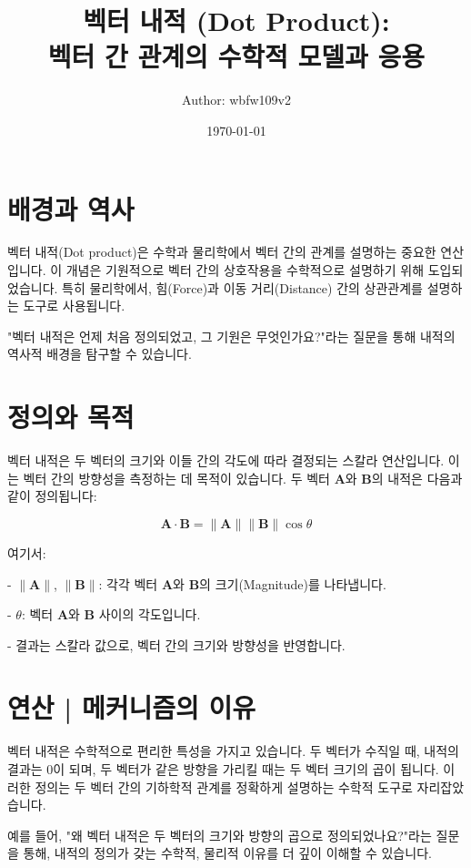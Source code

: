 \documentclass[12pt]{article}
\title{
    벡터 내적 (Dot Product): \\
    벡터 간 관계의 수학적 모델과 응용
}
\author{Author: wbfw109v2}
\date{\today}
\begin{document}
\maketitle
\tableofcontents

\section{배경과 역사}

\noindent 벡터 내적(Dot product)은 수학과 물리학에서 벡터 간의 관계를 설명하는 중요한 연산입니다. 이 개념은 기원적으로 벡터 간의 상호작용을 수학적으로 설명하기 위해 도입되었습니다. 특히 물리학에서, 힘(Force)과 이동 거리(Distance) 간의 상관관계를 설명하는 도구로 사용됩니다.

\noindent "벡터 내적은 언제 처음 정의되었고, 그 기원은 무엇인가요?"라는 질문을 통해 내적의 역사적 배경을 탐구할 수 있습니다.

\section{정의와 목적}

\noindent 벡터 내적은 두 벡터의 크기와 이들 간의 각도에 따라 결정되는 스칼라 연산입니다. 이는 벡터 간의 방향성을 측정하는 데 목적이 있습니다. 두 벡터 \( \mathbf{A} \)와 \( \mathbf{B} \)의 내적은 다음과 같이 정의됩니다:

\[
  \mathbf{A} \cdot \mathbf{B} = \| \mathbf{A} \| \| \mathbf{B} \| \cos{\theta}
\]

\noindent 여기서:

- \( \| \mathbf{A} \| \), \( \| \mathbf{B} \| \): 각각 벡터 \( \mathbf{A} \)와 \( \mathbf{B} \)의 크기(Magnitude)를 나타냅니다.

- \( \theta \): 벡터 \( \mathbf{A} \)와 \( \mathbf{B} \) 사이의 각도입니다.

- 결과는 스칼라 값으로, 벡터 간의 크기와 방향성을 반영합니다.

\section{연산 | 메커니즘의 이유}

\noindent 벡터 내적은 수학적으로 편리한 특성을 가지고 있습니다. 두 벡터가 수직일 때, 내적의 결과는 0이 되며, 두 벡터가 같은 방향을 가리킬 때는 두 벡터 크기의 곱이 됩니다. 이러한 정의는 두 벡터 간의 기하학적 관계를 정확하게 설명하는 수학적 도구로 자리잡았습니다.

\noindent 예를 들어, "왜 벡터 내적은 두 벡터의 크기와 방향의 곱으로 정의되었나요?"라는 질문을 통해, 내적의 정의가 갖는 수학적, 물리적 이유를 더 깊이 이해할 수 있습니다.
\end{document}

